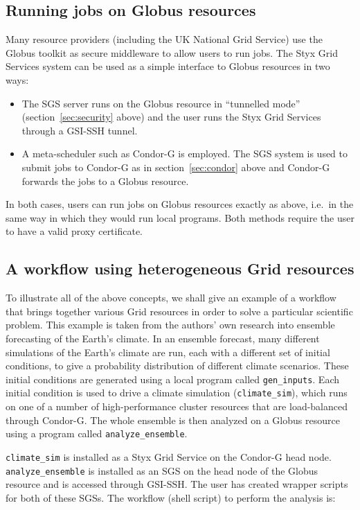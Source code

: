 \documentclass[a4paper]{article}
\begin{document}
\subsection{Running jobs on Globus resources}
Many resource providers (including the UK National Grid Service) use the Globus toolkit as secure middleware to allow users to run jobs.  The Styx Grid Services system can be used as a simple interface to Globus resources in two ways:

\begin{itemize}
	\item The SGS server runs on the Globus resource in ``tunnelled mode'' (section~\ref{sec:security} above) and the user runs the Styx Grid Services through a GSI-SSH tunnel.
	\item A meta-scheduler such as Condor-G is employed.  The SGS system is used to submit jobs to Condor-G as in section~\ref{sec:condor} above and Condor-G forwards the jobs to a Globus resource.
\end{itemize}

In both cases, users can run jobs on Globus resources exactly as above, i.e.\ in the same way in which they would run local programs.  Both methods require the user to have a valid proxy certificate.

\subsection{A workflow using heterogeneous Grid resources}
To illustrate all of the above concepts, we shall give an example of a workflow that brings together various Grid resources in order to solve a particular scientific problem.  This example is taken from the authors' own research into ensemble forecasting of the Earth's climate.  In an ensemble forecast, many different simulations of the Earth's climate are run, each with a different set of initial conditions, to give a probability distribution of different climate scenarios.  These initial conditions are generated using a local program called \texttt{gen\_inputs}.  Each initial condition is used to drive a climate simulation (\texttt{climate\_sim}), which runs on one of a number of high-performance cluster resources that are load-balanced through Condor-G.  The whole ensemble is then analyzed on a Globus resource using a program called \texttt{analyze\_ensemble}.

\texttt{climate\_sim} is installed as a Styx Grid Service on the Condor-G head node.  \texttt{analyze\_ensemble} is installed as an SGS on the head node of the Globus resource and is accessed through GSI-SSH.  The user has created wrapper scripts for both of these SGSs.  The workflow (shell script) to perform the analysis is:
\end{document}

